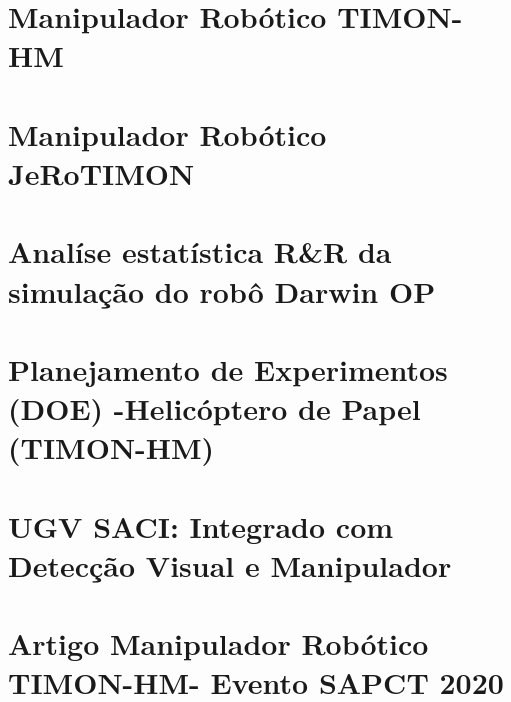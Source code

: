 \documentclass[fancyheadings, fancychapter, sureport]{Classes/a-prj}
\begin{document}
    \begin{thesisappendices}
        \chapter{Manipulador Robótico TIMON-HM}
        \label{append:timon}
        
        \chapter{Manipulador Robótico JeRoTIMON}
        \label{append:jerotimon}
        

        \chapter{Analíse estatística R\&R da simulação do robô Darwin OP}
        \label{append:darwinop}
        

        \chapter{Planejamento de Experimentos (DOE) -Helicóptero de Papel (TIMON-HM)}
        \label{append:doe}
        

        \chapter{UGV SACI: Integrado com Detecção Visual e Manipulador}
        \label{append:saci}
        
        
        \chapter{Artigo Manipulador Robótico TIMON-HM- Evento SAPCT 2020}
        \label{append:sapct}
        


\end{thesisappendices}
\end{document}
